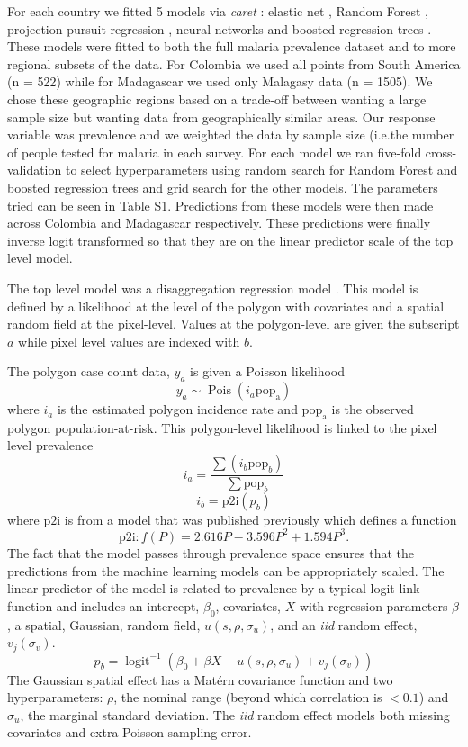 \documentclass[11pt]{article}
\begin{document}
For each country we fitted 5 models via \emph{caret} \citep{caret}: elastic net \citep{enet}, Random Forest \citep{wright2015ranger}, projection pursuit regression \citep{friedman1981projection}, neural networks \citep{nnet} and boosted regression trees \citep{gbm}.
These models were fitted to both the full malaria prevalence dataset and to more regional subsets of the data.
For Colombia we used all points from South America (n = 522) while for Madagascar we used only Malagasy data (n = 1505).
We chose these geographic regions based on a trade-off between wanting a large sample size but wanting data from geographically similar areas.
Our response variable was prevalence and we weighted the data by sample size (i.e.\thinspace the number of people tested for malaria in each survey.
For each model we ran  five-fold cross-validation to select hyperparameters using random search for Random Forest and boosted regression trees and grid search for the other models. 
The parameters tried can be seen in Table S1.
Predictions from these models were then made across Colombia and Madagascar respectively.
These predictions were finally inverse logit transformed so that they are on the linear predictor scale of the top level model.

The top level model was a disaggregation regression model \citep{sturrock2014fine, wilson2017pointless, law2018variational, taylor2017continuous, li2012log}.
This model is defined by a likelihood at the level of the polygon with covariates and a spatial random field at the pixel-level. 
Values at the polygon-level are given the subscript $a$ while pixel level values are indexed with $b$.

The polygon case count data, $y_a$ is given a Poisson likelihood
$$y_a \sim \operatorname{Pois}(i_a\mathrm{pop_a})$$
where $i_a$ is the estimated polygon incidence rate and $\mathrm{pop_a}$ is the observed polygon population-at-risk. 
This polygon-level likelihood is linked to the pixel level prevalence 
$$i_a = \frac{ \sum(i_b \mathrm{pop}_b)}{\sum  \mathrm{pop}_b} $$
$$i_b = \mathrm{p2i}(p_b)$$
where $\mathrm{p2i}$ is from a model that was published previously \citep{cameron2015defining} which defines a function
$$\mathrm{p2i}: f(P) = 2.616P - 3.596P^2 + 1.594P^3.$$
The fact that the model passes through prevalence space ensures that the predictions from the machine learning models can be appropriately scaled.
The linear predictor of the model is related to prevalence by a typical logit link function and includes an intercept, $\beta_0$, covariates, $X$ with regression parameters $\beta$, a spatial, Gaussian, random field, $u(s, \rho, \sigma_u)$, and an \emph{iid} random effect, $v_j(\sigma_v)$.
$$p_b = \operatorname{logit}^{-1}\left(\beta_0 + \beta X  + u(s, \rho, \sigma_u) + v_j(\sigma_v)\right)$$
The Gaussian spatial effect has a Mat\'ern covariance function and two hyperparameters: $\rho$, the nominal range (beyond which correlation is $< 0.1$) and $\sigma_u$, the marginal standard deviation.
The \emph{iid} random effect models both missing covariates and extra-Poisson sampling error.
\end{document}

